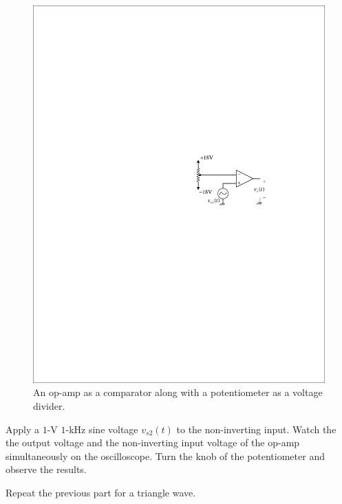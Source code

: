 \documentclass[11pt]{article}
\begin{document}
\begin{question}


\begin{figure}[H]
\centering
\includegraphics[scale=1.2,angle=0]{Fig/cir2.pdf}
\caption{An op-amp as a comparator along with a potentiometer as a voltage divider.} \label{fig:cir2}
\end{figure}

\begin{subquestion}{Apply a $1$-V $1$-kHz sine voltage $v_{s2}(t)$ to the non-inverting input. Watch the the output voltage and the non-inverting input voltage of the op-amp simultaneously on the oscilloscope. Turn the knob of the potentiometer and observe the results.} 
\answer{}
\end{subquestion}

\begin{subquestion}{Repeat the previous part for a triangle wave.} 
\answer{}
\end{subquestion}


\end{question}
\end{document}
